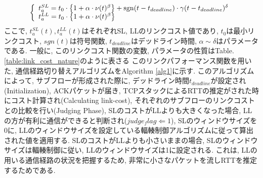 \begin{eqnarray}
\label{linkcost}
\left\{
\begin{array}{l}
t_{a}^{SL} = t_0 \cdot \bigl\{ 1 + \alpha \cdot \nu(t)^\beta \bigr\} +
{\rm sgn} (t - t_{deadline}) \cdot \gamma (t - t_{deadline})^\delta \\
t_{a}^{LL} = t_0 \cdot \bigl\{ 1 + \alpha \cdot \nu(t)^\beta \bigr\} 
\end{array}
\right.
\end{eqnarray} 
ここで, $t^{SL}_a(t), t^{LL}_a(t)$はそれぞれSL, LLのリンクコスト値であり, $t_0$は最小リンクコスト,
$sgn(t)$は符号関数, $t_{deadline}$はデッドライン時間, $\alpha \sim \delta$はパラメータである.
一般に, このリンクコスト関数の変数, パラメータの性質はTable.\ref{table:link_cost_nature}のように表さる
このリンクパフォーマンス関数を用いた, 通信経路切り替えアルゴリズムをAlgorithm \ref{alg1}に示す. 
このアルゴリズムによって, サブフローが形成された際に, デッドライン時間$t_{deadline}$が設定され(Initialization),
ACKパケットが届き, TCPスタックによるRTTの推定がされた時にコスト計算され(Calculating link-cost),
それぞれのサブフローのリンクコストとの比較を行い(Judging Phase), SLのコストがLLよりも大きくなった場合,
LLの方が有利に通信ができると判断され($judge_flag \Leftarrow 1$), SLのウィンドウサイズを0に,
LLのウィンドウサイズを設定している輻輳制御アルゴリズムに従って算出された値を適用する. 
SLのコストがLLよりも小さいままの場合, SLのウィンドウサイズは輻輳制御に従い, LLのウィンドウサイズは1に設定される. 
これは, LLの用いる通信経路の状況を把握するため, 非常に小さなパケットを流しRTTを推定するためである. 


